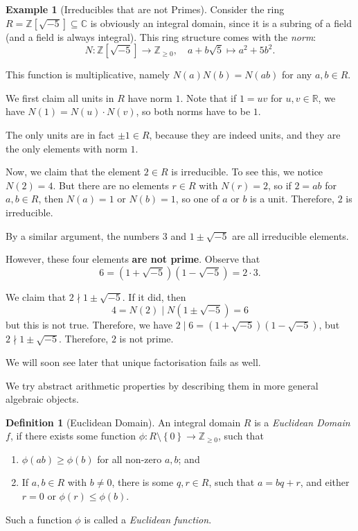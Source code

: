 \documentclass{article}
\theoremstyle{definition}
\newtheorem{definition}[theorem]{Definition}
\newtheorem{example}[theorem]{Example}
\theoremstyle{remark}
\newcommand{\pqty}[1]{\left(#1\right)}
\newcommand{\bqty}[1]{\left[#1\right]}
\newcommand{\Bqty}[1]{\left\{#1\right\}}
\newcommand{\functiondomain}[3]{#1:#2\to #3}
\newcommand{\function}[5]{#1:#2\to #3,\quad #4\mapsto #5}
\newcommand{\subring}{\subseteq}
\newcommand{\divides}{\mid}
\newcommand{\notdivides}{\nmid}
\newcommand{\ZZ}{\mathbb{Z}}
\newcommand{\RR}{\mathbb{R}}
\newcommand{\CC}{\mathbb{C}}
\begin{document}
\begin{example}[Irreducibles that are not Primes]
    \label{ex:irreducible-not-prime}%
    Consider the ring \(R = \ZZ\bqty{\sqrt{-5}} \subring \CC\) is obviously an integral domain, since it is a subring of a field (and a field is always integral). This ring structure comes with the \emph{norm}:
    \[
        \function{N}{\ZZ\bqty{\sqrt{-5}}}{\ZZ_{\geq 0}}{a + b \sqrt{5}}{a^2 + 5 b^2.}
    \]

    This function is multiplicative, namely \(N\pqty{a} N\pqty{b} = N\pqty{ab}\) for any \(a, b \in R\).

    We first claim all units in \(R\) have norm \(1\). Note that if \(1 = uv\) for \(u, v \in \RR\), we have \(N\pqty{1} = N\pqty{u} \cdot N\pqty{v}\), so both norms have to be \(1\).

    The only units are in fact \(\pm 1 \in R\), because they are indeed units, and they are the only elements with norm \(1\). 

    Now, we claim that the element \(2 \in R\) is irreducible. To see this, we notice \(N\pqty{2} = 4\). But there are no elements \(r \in R\) with \(N\pqty{r} = 2\), so if \(2 = ab\) for \(a, b \in R\), then \(N\pqty{a} = 1\) or \(N\pqty{b} = 1\), so one of \(a\) or \(b\) is a unit. Therefore, \(2\) is irreducible.

    By a similar argument, the numbers \(3\) and \(1 \pm \sqrt{-5}\) are all irreducible elements.

    However, these four elements \textbf{are not prime}. Observe that
    \[
        6 = \pqty{1 + \sqrt{-5}} \pqty{1 - \sqrt{-5}} = 2 \cdot 3.
    \]

    We claim that \(2 \notdivides 1 \pm \sqrt{-5}\). If it did, then
    \[
        4 = N\pqty{2} \divides N\pqty{1 \pm \sqrt{-5}} = 6
    \]
    but this is not true. Therefore, we have \(2 \divides 6 = \pqty{1 + \sqrt{-5}} \pqty{1 - \sqrt{-5}}\), but \(2 \notdivides 1 \pm \sqrt{-5}\). Therefore, \(2\) is not prime.

    We will soon see later that unique factorisation fails as well.
\end{example}

We try abstract arithmetic properties by describing them in more general algebraic objects.

\begin{definition}[Euclidean Domain]
    \label{def:euclidean-domain}%
    An integral domain \(R\) is a \emph{Euclidean Domain} \(f\), if there exists some function \(\functiondomain{\phi}{R \setminus \Bqty{0}}{\ZZ_{\geq 0}}\), such that
    \begin{enumerate}
        \item \(\phi\pqty{ab} \geq \phi\pqty{b}\) for all non-zero \(a, b\); and
        \item If \(a, b \in R\) with \(b \neq 0\), there is some \(q, r \in R\), such that \(a = bq + r\), and either \(r = 0\) or \(\phi\pqty{r} \leq \phi\pqty{b}\).
    \end{enumerate}

    Such a function \(\phi\) is called a \emph{Euclidean function}.
\end{definition}
\end{document}
